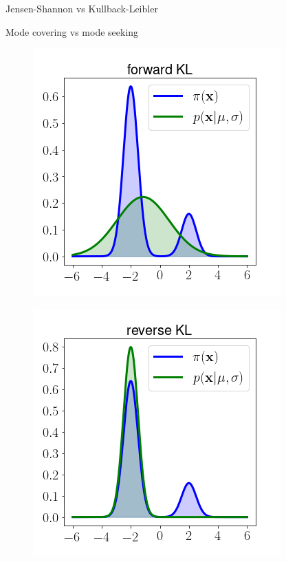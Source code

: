 \begin{frame}{Jensen-Shannon vs Kullback-Leibler }
\begin{block}{Mode covering vs mode seeking}
		\begin{minipage}[t]{0.33\columnwidth}
			\begin{figure}
				\includegraphics[width=\linewidth]{figs/forward_KL}
			\end{figure}
		\end{minipage}%
		\begin{minipage}[t]{0.33\columnwidth}
			\begin{figure}
				\includegraphics[width=\linewidth]{figs/reverse_KL}

\end{figure}
\end{minipage}
\end{block}
\end{frame}
